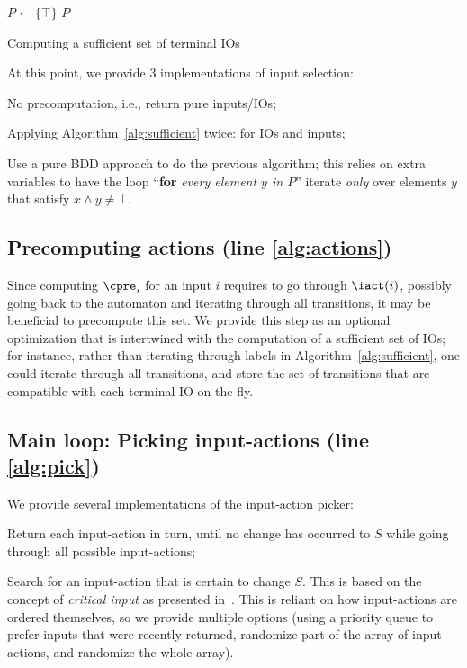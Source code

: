 \documentclass[runningheads,a4paper]{llncs}
\begin{document}
\begin{algorithm}

\BlankLine
\(P \leftarrow \{\top\}\)\;
\Return \(P\)
\caption{Computing a sufficient set of terminal IOs}
\label{alg:sufficient}
\end{algorithm}
\noindent At this point, we provide 3 implementations of input selection:
\begin{compactitem}
\item No precomputation, i.e., return pure inputs/IOs;
\item Applying Algorithm~\ref{alg:sufficient} twice: for IOs and inputs;
\item Use a pure BDD approach to do the previous algorithm; this relies on extra
  variables to have the loop ``\textbf{for}\emph{ every element \(y\) in \(P\)}''
  iterate \emph{only} over elements \(y\) that satisfy \(x \land y \neq \bot\).
\end{compactitem}

\subsection{Precomputing actions (line \ref{alg:actions})}

Since computing \(\cpre_i\) for an input \(i\) requires to go through
\(\iact(i)\), possibly going back to the automaton and iterating through all
transitions, it may be beneficial to precompute this set.  We provide this step
as an optional optimization that is intertwined with the computation of a
sufficient set of IOs; for instance, rather than iterating through labels in
Algorithm~\ref{alg:sufficient}, one could iterate through all transitions, and
store the set of transitions that are compatible with each terminal IO on the
fly.

\subsection{Main loop: Picking input-actions (line \ref{alg:pick})}\label{sec:io}

We provide several implementations of the input-action picker:
\begin{compactitem}
\item Return each input-action in turn, until no change has occurred to \(S\)
  while going through all possible input-actions;
\item Search for an input-action that is certain to change \(S\).  This is based
  on the concept of \emph{critical input} as presented in~\cite{bohy14}.  This
  is reliant on how input-actions are ordered themselves, so we provide multiple
  options (using a priority queue to prefer inputs that were recently returned,
  randomize part of the array of input-actions, and randomize the whole array).
\end{compactitem}
\end{document}
